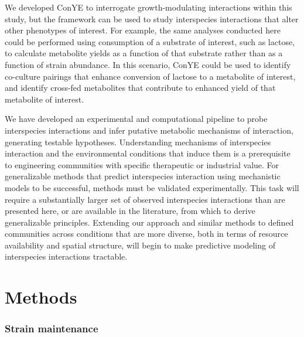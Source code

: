 \documentclass[11pt,twocolumn,notitlepage,openany,twoside]{book}
\begin{document}
\begin{refsection}
We developed ConYE to interrogate growth-modulating interactions within this study, but the framework can be used to study interspecies interactions that alter other phenotypes of interest. For example, the same analyses conducted here could be performed using consumption of a substrate of interest, such as lactose, to calculate metabolite yields as a function of that substrate rather than as a function of strain abundance. In this scenario, ConYE could be used to identify co-culture pairings that enhance conversion of lactose to a metabolite of interest, and identify cross-fed metabolites that contribute to enhanced yield of that metabolite of interest.

We have developed an experimental and computational pipeline to probe interspecies interactions and infer putative metabolic mechanisms of interaction, generating testable hypotheses. Understanding mechanisms of interspecies interaction and the environmental conditions that induce them is a prerequisite to engineering communities with specific therapeutic or industrial value. For generalizable methods that predict interspecies interaction using mechanistic models to be successful, methods must be validated experimentally. This task will require a substantially larger set of observed interspecies interactions than are presented here, or are available in the literature, from which to derive generalizable principles. Extending our approach and similar methods to defined communities across conditions that are more diverse, both in terms of resource availability and spatial structure, will begin to make predictive modeling of interspecies interactions tractable.

\section{Methods}
\subsubsection{Strain maintenance}


\end{refsection}
\end{document}
